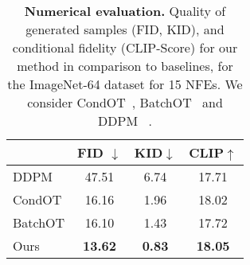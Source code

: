 
\begin{table}\centering


    \caption{\textbf{Numerical evaluation.} Quality of generated samples (FID, KID), and conditional fidelity (CLIP-Score) for our method in comparison to baselines, for the ImageNet-64 dataset for 15 NFEs. We consider CondOT~\cite{lipman2022flow}, BatchOT~\cite{pooladian2023multisample} and DDPM ~\cite{ho2020denoising}. 
    }
    \vskip 0.05in
    \centering
    \begin{tabular}{lccc}
    \toprule
               & FID $\downarrow$ & KID$\downarrow$ & CLIP$ \uparrow$\\
            \midrule
            DDPM & 47.51 & 6.74 & 17.71 \\
            CondOT & 16.16 & 1.96 & 18.02 \\
            BatchOT & 16.10 & 1.43 & 17.72\\
            Ours & \bf 13.62 & \bf 0.83 & \bf 18.05 \\

\bottomrule
    \end{tabular}
\vspace{-0.4cm}
\label{tab:nfe_results}
\end{table}
